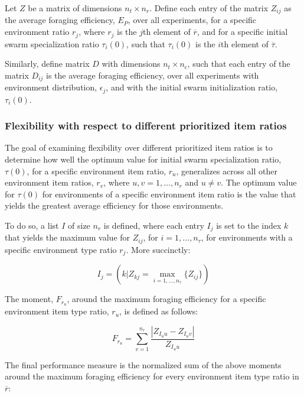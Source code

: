 \documentclass[preprint,12pt]{elsarticle}
\begin{document}
Let $Z$ be a matrix of dimensions $n_t \times n_r$. Define each entry of the matrix $Z_{ij}$ as the average foraging efficiency, $E_P$, over all experiments, for a specific environment ratio $r_j$, where $r_j$ is the $j$th element of $\overline{r}$, and for a specific initial swarm specialization ratio $\tau_i(0)$, such that $\tau_i(0)$ is the $i$th element of $\overline{\tau}$.

Similarly, define matrix $D$ with dimensions $n_t \times n_\epsilon$, such that each entry of the matrix $D_{ij}$ is the average foraging efficiency, over all experiments with environment distribution, $\epsilon_j$, and with the initial swarm initialization ratio, $\tau_i(0)$.


\subsubsection{Flexibility with respect to different prioritized item ratios}
\label{setup:flexibility:prioritizeditemratio}

The goal of examining flexibility over different prioritized item ratios is to determine how well the optimum value for initial swarm specialization ratio, $\tau(0)$, for a specific environment item ratio, $r_u$, generalizes across all other environment item ratios, $r_v$, where $u,v = 1,...,n_r$ and $u \neq v$. The optimum value for $\tau(0)$ for environments of a specific environment item ratio is the value that yields the greatest average efficiency for those environments.

To do so, a list $I$ of size $n_r$ is defined, where each entry $I_j$ is set to the index $k$ that yields the maximum value for $Z_{ij}$, for $i = 1,..., n_\tau$, for environments with a specific environment type ratio $r_j$. More succinctly:

\begin{equation}
I_j = ( k | Z_{kj} = \max_{i=1,...,n_\tau}\{Z_{ij}\} )
\end{equation}

The moment, $F_{r_u}$, around the maximum foraging efficiency for a specific environment item type ratio, $r_u$, is defined as follows: 

\begin{equation}
F_{r_u} = \sum_{v=1}^{n_r}\dfrac{|Z_{I_uu}- Z_{I_uv}|}{Z_{I_uu}}
\end{equation}

The final performance measure is the normalized sum of the above moments around the maximum foraging efficiency for every environment item type ratio in $\overline{r}$:
\end{document}
